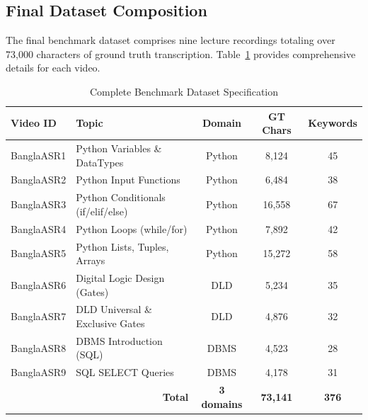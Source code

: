 \subsection{Final Dataset Composition}

The final benchmark dataset comprises nine lecture recordings totaling over 73,000 characters of ground truth transcription. Table~\ref{tab:dataset_full} provides comprehensive details for each video.

\begin{table}[h]
\centering
\caption{Complete Benchmark Dataset Specification}
\label{tab:dataset_full}
\begin{tabular}{|l|p{4.5cm}|c|c|c|}
\hline
\textbf{Video ID} & \textbf{Topic} & \textbf{Domain} & \textbf{GT Chars} & \textbf{Keywords} \\
\hline
BanglaASR1 & Python Variables \& DataTypes & Python & 8,124 & 45 \\
\hline
BanglaASR2 & Python Input Functions & Python & 6,484 & 38 \\
\hline
BanglaASR3 & Python Conditionals (if/elif/else) & Python & 16,558 & 67 \\
\hline
BanglaASR4 & Python Loops (while/for) & Python & 7,892 & 42 \\
\hline
BanglaASR5 & Python Lists, Tuples, Arrays & Python & 15,272 & 58 \\
\hline
BanglaASR6 & Digital Logic Design (Gates) & DLD & 5,234 & 35 \\
\hline
BanglaASR7 & DLD Universal \& Exclusive Gates & DLD & 4,876 & 32 \\
\hline
BanglaASR8 & DBMS Introduction (SQL) & DBMS & 4,523 & 28 \\
\hline
BanglaASR9 & SQL SELECT Queries & DBMS & 4,178 & 31 \\
\hline
\multicolumn{2}{|r|}{\textbf{Total}} & \textbf{3 domains} & \textbf{73,141} & \textbf{376} \\
\hline
\end{tabular}
\end{table}

